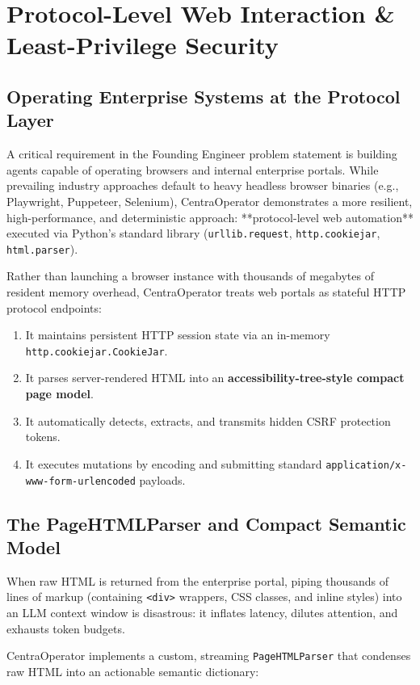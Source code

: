 \section{Protocol-Level Web Interaction \& Least-Privilege Security}
\label{sec:browserless_automation}

\subsection{Operating Enterprise Systems at the Protocol Layer}
A critical requirement in the Founding Engineer problem statement is building agents capable of operating browsers and internal enterprise portals. While prevailing industry approaches default to heavy headless browser binaries (e.g., Playwright, Puppeteer, Selenium), CentraOperator demonstrates a more resilient, high-performance, and deterministic approach: **protocol-level web automation** executed via Python's standard library (\texttt{urllib.request}, \texttt{http.cookiejar}, \texttt{html.parser}).

Rather than launching a browser instance with thousands of megabytes of resident memory overhead, CentraOperator treats web portals as stateful HTTP protocol endpoints:
\begin{enumerate}
  \item It maintains persistent HTTP session state via an in-memory \texttt{http.cookiejar.CookieJar}.
  \item It parses server-rendered HTML into an \textbf{accessibility-tree-style compact page model}.
  \item It automatically detects, extracts, and transmits hidden CSRF protection tokens.
  \item It executes mutations by encoding and submitting standard \texttt{application/x-www-form-urlencoded} payloads.
\end{enumerate}

\subsection{The PageHTMLParser and Compact Semantic Model}
When raw HTML is returned from the enterprise portal, piping thousands of lines of markup (containing \texttt{<div>} wrappers, CSS classes, and inline styles) into an LLM context window is disastrous: it inflates latency, dilutes attention, and exhausts token budgets.

CentraOperator implements a custom, streaming \texttt{PageHTMLParser} that condenses raw HTML into an actionable semantic dictionary:

